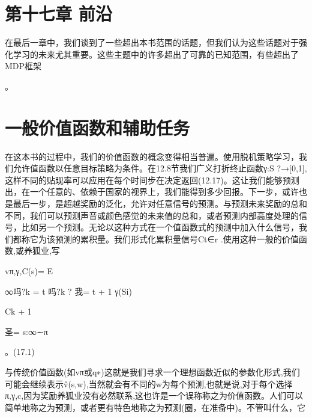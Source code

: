 \section{第十七章 前沿}
\begin{summary}
	在最后一章中，我们谈到了一些超出本书范围的话题，但我们认为这些话题对于强化学习的未来尤其重要。这些主题中的许多超出了可靠的已知范围，有些超出了MDP框架
\end{summary}。


\section{一般价值函数和辅助任务}

在这本书的过程中，我们的价值函数的概念变得相当普遍。使用脱机策略学习，我们允许值函数以任意目标策略为条件。在12.8节我们广义打折终止函数γ:S ?→[0,1],这样不同的贴现率可以应用在每个时间步在决定返回(12.17)。这让我们能够预测出，在一个任意的、依赖于国家的视界上，我们能得到多少回报。下一步，或许也是最后一步，是超越奖励的泛化，允许对任意信号的预测。与预测未来奖励的总和不同，我们可以预测声音或颜色感觉的未来值的总和，或者预测内部高度处理的信号，比如另一个预测。无论以这种方式在一个值函数式的预测中加入什么信号，我们都称它为该预测的累积量。我们形式化累积量信号Ct∈r .使用这种一般的价值函数,或养狐业,写

vπ,γ,C(s)= E

∞吗?k = t
吗?k ?
我= t + 1
γ(Si)

Ck + 1

圣= s:∞∼π

。(17.1)

与传统价值函数(如vπ或q∗)这就是我们寻求一个理想函数近似的参数化形式,我们可能会继续表示v̂(s,w),当然就会有不同的w为每个预测,也就是说,对于每个选择π,γ,c,因为奖励养狐业没有必然联系,这也许是一个误称称之为价值函数。人们可以简单地称之为预测，或者更有特色地称之为预测(圈，在准备中)。不管叫什么，它

